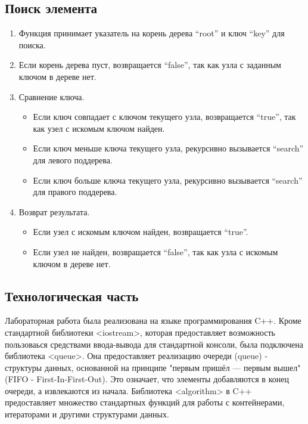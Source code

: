 \documentclass[12pt, a4paper]{article}
\begin{document}
\subsection{Поиск элемента}
\begin{enumerate}
    \item Функция принимает указатель на корень дерева ``root'' и ключ ``key'' для поиска.
    \item Если корень дерева пуст, возвращается ``false'', так как узла с заданным ключом в дереве нет.
    \item Сравнение ключа.
    \begin{itemize}
        \item[---] Если ключ совпадает с ключом текущего узла, возвращается ``true'', так как узел с искомым ключом найден.
        \item[---] Если ключ меньше ключа текущего узла, рекурсивно вызывается ``search'' для левого поддерева.
        \item[---] Если ключ больше ключа текущего узла, рекурсивно вызывается ``search'' для правого поддерева.
    \end{itemize}
    \item Возврат результата.
    \begin{itemize}
        \item[---] Если узел с искомым ключом найден, возвращается ``true''.
        \item[---] Если узел не найден, возвращается ``false'', так как узла с искомым ключом в дереве нет. 
    \end{itemize}
\end{enumerate}

\newpage
\begin{center}
    \section{Технологическая часть}
\end{center}

Лабораторная работа была реализована на языке программирования C++. Кроме стандартной библиотеки <iostream>, которая предоставляет возможность пользоваься средствами ввода-вывода для стандартной консоли, была подключена библиотека <queue>. Она предоставляет реализацию очереди (queue) - структуры данных, основанной на принципе "первым пришёл — первым вышел" (FIFO - First-In-First-Out). Это означает, что элементы добавляются в конец очереди, а извлекаются из начала. Библиотека <algorithm> в C++ предоставляет множество стандартных функций для работы с контейнерами, итераторами и другими структурами данных.
\end{document}
